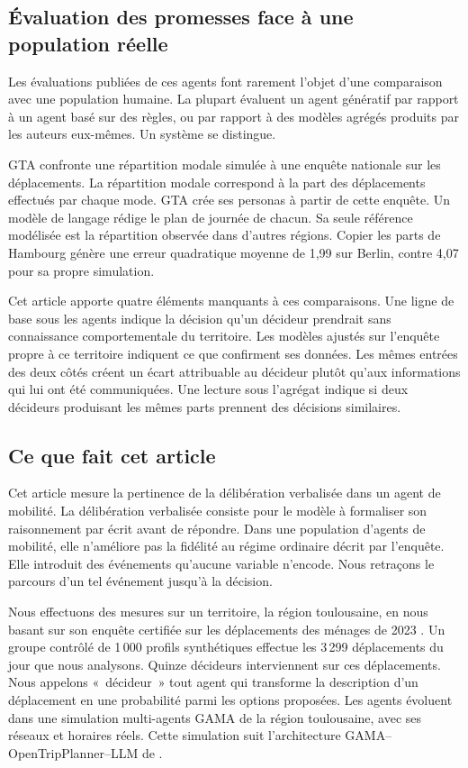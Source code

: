 \subsection{Évaluation des promesses face à une population réelle}
\label{sec:gap}

Les évaluations publiées de ces agents font rarement l'objet d'une comparaison avec une population humaine. La plupart évaluent un agent génératif par rapport à un agent basé sur des règles, ou par rapport à des modèles agrégés produits par les auteurs eux-mêmes. Un système se distingue.

GTA \citep{lammer2026gta} confronte une répartition modale simulée à une enquête nationale sur les déplacements. La répartition modale correspond à la part des déplacements effectués par chaque mode. GTA crée ses personas à partir de cette enquête. Un modèle de langage rédige le plan de journée de chacun. Sa seule référence modélisée est la répartition observée dans d'autres régions. Copier les parts de Hambourg génère une erreur quadratique moyenne de 1,99 sur Berlin, contre 4,07 pour sa propre simulation.

Cet article apporte quatre éléments manquants à ces comparaisons. Une ligne de base sous les agents indique la décision qu'un décideur prendrait sans connaissance comportementale du territoire. Les modèles ajustés sur l'enquête propre à ce territoire indiquent ce que confirment ses données. Les mêmes entrées des deux côtés créent un écart attribuable au décideur plutôt qu'aux informations qui lui ont été communiquées. Une lecture sous l'agrégat indique si deux décideurs produisant les mêmes parts prennent des décisions similaires.

\subsection{Ce que fait cet article}
\label{sec:contributions}

Cet article mesure la pertinence de la délibération verbalisée dans un agent de mobilité. La délibération verbalisée consiste pour le modèle à formaliser son raisonnement par écrit avant de répondre. Dans une population d'agents de mobilité, elle n'améliore pas la fidélité au régime ordinaire décrit par l'enquête. Elle introduit des événements qu'aucune variable n'encode. Nous retraçons le parcours d'un tel événement jusqu'à la décision.

Nous effectuons des mesures sur un territoire, la région toulousaine, en nous basant sur son enquête certifiée sur les déplacements des ménages de 2023 \citep{tisseo2023emc2}. Un groupe contrôlé de 1\,000 profils synthétiques effectue les 3\,299 déplacements du jour que nous analysons. Quinze décideurs interviennent sur ces déplacements. Nous appelons «~décideur~» tout agent qui transforme la description d'un déplacement en une probabilité parmi les options proposées. Les agents évoluent dans une simulation multi-agents GAMA de la région toulousaine, avec ses réseaux et horaires réels. Cette simulation suit l'architecture GAMA--OpenTripPlanner--LLM de \citet{vu2025modeling}.

